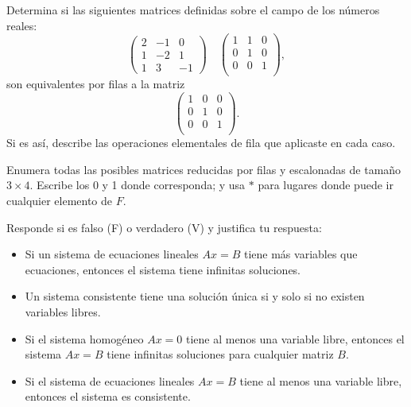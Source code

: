 \documentclass[12pt,a4paper]{book}
\begin{document}
    \begin{ejercicio}
        Determina si las siguientes matrices definidas sobre el campo de los números reales:
        \begin{equation*}
        \begin{pmatrix}
            2 & -1 & 0 \\
            1 & -2 & 1 \\
            1 & 3 & -1
        \end{pmatrix}
        \quad
        \begin{pmatrix}
            1 & 1 & 0 \\
            0 & 1 & 0 \\
            0 & 0 & 1 \\
        \end{pmatrix},
        \end{equation*}
        son equivalentes por filas a la matriz
        \begin{equation*}
        \begin{pmatrix}
        1 & 0 & 0 \\
        0 & 1 & 0 \\
        0 & 0 & 1 \\
        \end{pmatrix}.
        \end{equation*}
        Si es así, describe las operaciones elementales de fila que aplicaste en cada caso.
    \end{ejercicio}

    \begin{ejercicio}
        Enumera todas las posibles matrices reducidas por filas y escalonadas de tamaño $3 \times 4$. Escribe los 0 y 1 donde corresponda; y usa $\ast$ para lugares donde puede ir cualquier elemento de $F$.
    \end{ejercicio}

    \begin{ejercicio}
        Responde si es falso (F) o verdadero (V) y justifica tu respuesta:
        \begin{itemize}
            \item[(a)] Si un sistema de ecuaciones lineales $Ax = B$ tiene más variables que ecuaciones, entonces el sistema tiene infinitas soluciones.
            \item[(b)] Un sistema consistente tiene una solución única si y solo si no existen variables libres.
            \item[(c)] Si el sistema homogéneo $Ax = 0$ tiene al menos una variable libre, entonces el sistema $Ax = B$ tiene infinitas soluciones para cualquier matriz $B$.
            \item[(d)] Si el sistema de ecuaciones lineales $Ax = B$ tiene al menos una variable libre, entonces el sistema es consistente.
        \end{itemize}
    \end{ejercicio}
\end{document}
